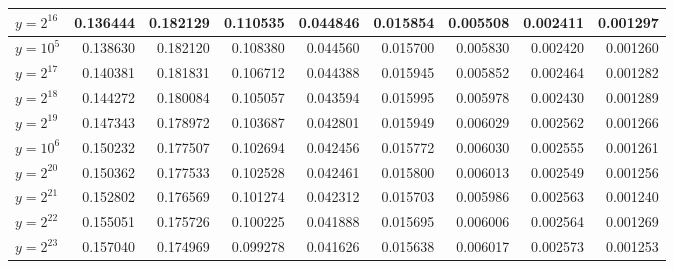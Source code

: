 \documentclass{article}
\theoremstyle{definition}
\begin{document}
\begin{table}[h!]
{\begin{tabular}{l|rrrrrrrr}
            $y = 2^{16}$             & 0.136444 & 0.182129              & 0.110535              & 0.044846              & 0.015854              & 0.005508              & 0.002411              & 0.001297              \\
            \hline
            $y = 10^{5}$             & 0.138630 & 0.182120              & 0.108380              & 0.044560              & 0.015700              & 0.005830              & 0.002420              & 0.001260              \\
            \hline
            $y = 2^{17}$             & 0.140381 & 0.181831              & 0.106712              & 0.044388              & 0.015945              & 0.005852              & 0.002464              & 0.001282              \\
            $y = 2^{18}$             & 0.144272 & 0.180084              & 0.105057              & 0.043594              & 0.015995              & 0.005978              & 0.002430              & 0.001289              \\
            $y = 2^{19}$             & 0.147343 & 0.178972              & 0.103687              & 0.042801              & 0.015949              & 0.006029              & 0.002562              & 0.001266              \\
            \hline
            $y = 10^{6}$             & 0.150232 & 0.177507              & 0.102694              & 0.042456              & 0.015772              & 0.006030              & 0.002555              & 0.001261              \\
            \hline
            $y = 2^{20}$             & 0.150362 & 0.177533              & 0.102528              & 0.042461              & 0.015800              & 0.006013              & 0.002549              & 0.001256              \\
            $y = 2^{21}$             & 0.152802 & 0.176569              & 0.101274              & 0.042312              & 0.015703              & 0.005986              & 0.002563              & 0.001240              \\
            $y = 2^{22}$             & 0.155051 & 0.175726              & 0.100225              & 0.041888              & 0.015695              & 0.006006              & 0.002564              & 0.001269              \\
            $y = 2^{23}$             & 0.157040 & 0.174969              & 0.099278              & 0.041626              & 0.015638              & 0.006017              & 0.002573              & 0.001253              \\

\end{tabular}}
\end{table}
\end{document}
